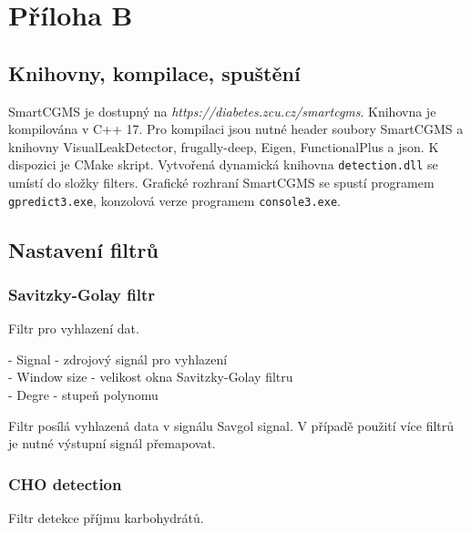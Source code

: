 \chapter*{Příloha B}

\section*{Knihovny, kompilace, spuštění}

SmartCGMS je dostupný na \textit{https://diabetes.zcu.cz/smartcgms}. Knihovna je kompilována v C++ 17. Pro kompilaci jsou nutné header soubory SmartCGMS a knihovny VisualLeakDetector, frugally-deep, Eigen, FunctionalPlus a json. K dispozici je CMake skript.
Vytvořená dynamická knihovna \texttt{detection.dll} se umístí do složky filters. Grafické rozhraní SmartCGMS se spustí programem \texttt{gpredict3.exe}, konzolová verze programem \texttt{console3.exe}.

\section*{Nastavení filtrů}

\subsection*{Savitzky-Golay filtr}

Filtr pro vyhlazení dat.

\noindent- Signal - zdrojový signál pro vyhlazení\\
- Window size - velikost okna Savitzky-Golay filtru\\
- Degre - stupeň polynomu

Filtr posílá vyhlazená data v signálu Savgol signal. V případě použití více filtrů je nutné výstupní signál přemapovat.

\subsection*{CHO detection}

Filtr detekce příjmu karbohydrátů.

